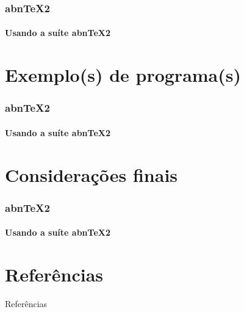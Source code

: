 \documentclass[aspectratio=169]{beamer}
\begin{document}
    \begin{frame}
      \frametitle{abnTeX2}
      \framesubtitle{Usando a suíte abnTeX2}
    \end{frame}


    \section{Exemplo(s) de programa(s)}

    \begin{frame}
      \frametitle{abnTeX2}
      \framesubtitle{Usando a suíte abnTeX2}
    \end{frame}

    \section{Considerações finais}

    \begin{frame}
      \frametitle{abnTeX2}
      \framesubtitle{Usando a suíte abnTeX2}
    \end{frame}

    \section{Referências}


    \begin{frame}[allowframebreaks]{Referências}
      
    \end{frame}

\end{document}
